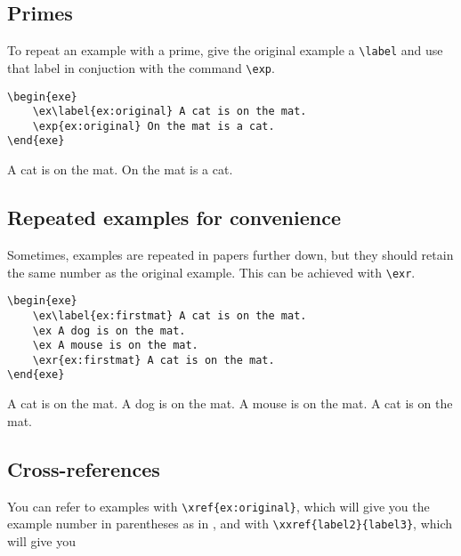 \documentclass[output=paper]{langscibook}
\newcommand{\cmd}[1]{\texttt{\textbackslash#1}}
\begin{document}
\subsection{Primes}
To repeat an example with a prime, give the original example a \cmd{label} and use that label in conjuction with the command \cmd{exp}.

\noindent
\begin{minipage}{.67\textwidth}
\begin{lstlisting}
\begin{exe}
    \ex\label{ex:original} A cat is on the mat.
    \exp{ex:original} On the mat is a cat.
\end{exe}
 \end{lstlisting}
\end{minipage}
\parbox{.33\textwidth}{
\begin{exe}
    \ex \label{ex:original} A cat is on the mat.
     On the mat is a cat.
\end{exe}
}

\subsection{Repeated examples for convenience}
Sometimes, examples are repeated in papers further down, but they should retain the same number as the original example. This can be achieved with \cmd{exr}.


\noindent
\begin{minipage}{.55\textwidth}
\begin{lstlisting}
\begin{exe}
    \ex\label{ex:firstmat} A cat is on the mat. 
    \ex A dog is on the mat. 
    \ex A mouse is on the mat. 
    \exr{ex:firstmat} A cat is on the mat. 
\end{exe}
 \end{lstlisting}
\end{minipage}
\parbox{.45\textwidth}{
\begin{exe}
    \ex\label{ex:firstmat} A cat is on the mat. 
    \ex A dog is on the mat. 
    \ex A mouse is on the mat. 
     A cat is on the mat. 
\end{exe}
}


\subsection{Cross-references}
You can refer to examples with \cmd{xref\{ex:original\}}, which will give you the example number in parentheses as in , and with \cmd{xxref\{label2\}\{label3\}}, which will give you 
\end{document}
